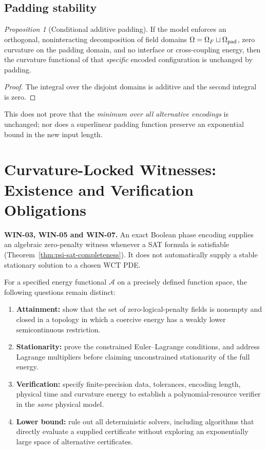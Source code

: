 \documentclass[12pt]{article}
\theoremstyle{remark}
\newtheorem{proposition}[theorem]{Proposition}
\begin{document}
\subsection{Padding stability}
\begin{proposition}[Conditional additive padding]
\label{thm:padding_stability}
If the model enforces an orthogonal, noninteracting decomposition of
field domains $\Omega=\Omega_F\sqcup\Omega_{\rm pad}$, zero
curvature on the padding domain, and no interface or cross-coupling
energy, then the curvature functional of that \emph{specific} encoded
configuration is unchanged by padding.
\end{proposition}
\begin{proof}
The integral over the disjoint domains is additive and the second
integral is zero.
\end{proof}
This does not prove that the \emph{minimum over all alternative
encodings} is unchanged; nor does a superlinear padding function
preserve an exponential bound in the new input length.

\section{Curvature-Locked Witnesses: Existence and Verification Obligations}
\noindent\textbf{WIN-03, WIN-05 and WIN-07.}
An exact Boolean phase encoding supplies an algebraic zero-penalty
witness whenever a SAT formula is satisfiable
(Theorem~\ref{thm:psi-sat-completeness}). It does not automatically
supply a stable stationary solution to a chosen WCT PDE.

For a specified energy functional $\mathcal A$ on a precisely defined
function space, the following questions remain distinct:
\begin{enumerate}
\item \textbf{Attainment:} show that the set of zero-logical-penalty
fields is nonempty and closed in a topology in which a coercive
energy has a weakly lower semicontinuous restriction.
\item \textbf{Stationarity:} prove the constrained Euler--Lagrange
conditions, and address Lagrange multipliers before claiming
unconstrained stationarity of the full energy.
\item \textbf{Verification:} specify finite-precision data, tolerances,
encoding length, physical time and curvature energy to establish a
polynomial-resource verifier in the \emph{same} physical model.
\item \textbf{Lower bound:} rule out all deterministic solvers, including
algorithms that directly evaluate a supplied certificate without
exploring an exponentially large space of alternative certificates.
\end{enumerate}
\end{document}

